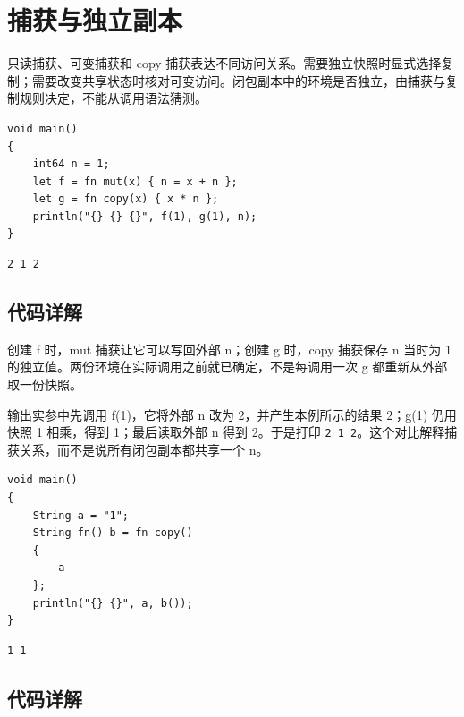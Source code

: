 \section{捕获与独立副本}

只读捕获、可变捕获和 copy 捕获表达不同访问关系。需要独立快照时显式选择复制；需要改变共享状态时核对可变访问。闭包副本中的环境是否独立，由捕获与复制规则决定，不能从调用语法猜测。

\par
\medskip
\begin{lstlisting}[style=chali]
void main()
{
    int64 n = 1;
    let f = fn mut(x) { n = x + n };
    let g = fn copy(x) { x * n };
    println("{} {} {}", f(1), g(1), n);
}
\end{lstlisting}
\par
\medskip

\par
\medskip
\begin{lstlisting}[style=out]
2 1 2
\end{lstlisting}
\par
\medskip

\subsection*{代码详解}

创建 f 时，mut 捕获让它可以写回外部 n；创建 g 时，copy 捕获保存 n 当时为 1 的独立值。两份环境在实际调用之前就已确定，不是每调用一次 g 都重新从外部取一份快照。

输出实参中先调用 f(1)，它将外部 n 改为 2，并产生本例所示的结果 2；g(1) 仍用快照 1 相乘，得到 1；最后读取外部 n 得到 2。于是打印 \texttt{2 1 2}。这个对比解释捕获关系，而不是说所有闭包副本都共享一个 n。

\par
\medskip
\begin{lstlisting}[style=chali]
void main()
{
    String a = "1";
    String fn() b = fn copy()
    {
        a
    };
    println("{} {}", a, b());
}
\end{lstlisting}
\par
\medskip

\par
\medskip
\begin{lstlisting}[style=out]
1 1
\end{lstlisting}
\par
\medskip

\subsection*{代码详解}

